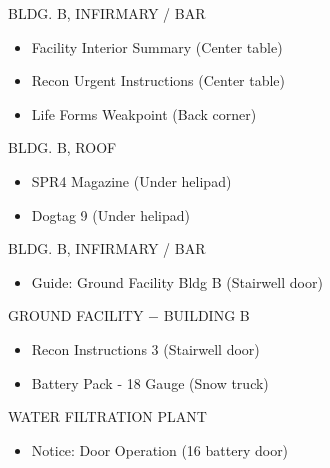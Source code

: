 \begin{subregion}{{BLDG. B, INFIRMARY / BAR}}
    \begin{itemize}
        \item Facility Interior Summary (Center table)
        \item Recon Urgent Instructions (Center table)
        \item Life Forms Weakpoint (Back corner)
    \end{itemize}
\end{subregion}

\begin{subregion}{{BLDG. B, ROOF}}
    \begin{itemize}
        \item SPR4 Magazine (Under helipad)
        \item Dogtag 9 (Under helipad)
    \end{itemize}
\end{subregion}

\begin{subregion}{{BLDG. B, INFIRMARY / BAR}}
    \begin{itemize}
        \item Guide: Ground Facility Bldg B (Stairwell door)
    \end{itemize}
\end{subregion}

\begin{subregion}{GROUND FACILITY $\boldsymbol{-}$ BUILDING B}
    \begin{itemize}
        \item Recon Instructions 3 (Stairwell door)
        \item Battery Pack - 18 Gauge (Snow truck)
    \end{itemize}
\end{subregion}

\begin{subregion}{WATER FILTRATION PLANT}
    \begin{itemize}
        \item Notice: Door Operation (16 battery door)
    \end{itemize}
\end{subregion}
